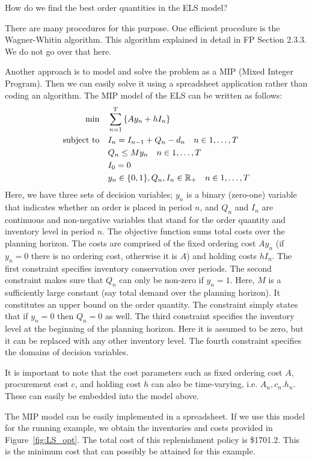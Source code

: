 \begin{exercise}
How do we find the best order quantities in the ELS model?


\begin{solution}
There are many procedures for this purpose. One efficient procedure is the Wagner-Whitin algorithm. This algorithm explained in detail in FP Section 2.3.3. We do not go over that here.

Another approach is to model and solve the problem as a MIP (Mixed Integer Program). Then we can easily solve it using a spreadsheet application rather than coding an algorithm. The MIP model of the ELS can be written as follows:
\begin{align*}
\min\quad 
	& \sum_{n=1}^T \left\{Ay_n + hI_n\right\} \\
\operatorname*{\operatorname{subject}\,\operatorname{to}}\quad
	& I_n = I_{n-1} + Q_n - d_n \quad n\in 1,\ldots,T \\
	& Q_n \leq M y_n \quad n\in 1,\ldots,T \\
	& I_0 = 0 \\
	& y_n \in \{0,1\}, Q_n, I_n \in \mathbb{R}_+ \quad n\in 1,\ldots,T
\end{align*}
Here, we have three sets of decision variables; $y_n$ is a binary (zero-one) variable that indicates whether an order is placed in period $n$, and $Q_n$ and $I_n$ are continuous and non-negative variables that stand for the order quantity and inventory level in period $n$. The objective function sums total costs over the planning horizon. The costs are comprised of the fixed ordering cost $Ay_n$ (if $y_n=0$ there is no ordering cost, otherwise it is $A$) and holding costs $hI_n$. The first constraint specifies inventory conservation over periods. The second constraint makes sure that $Q_n$ can only be non-zero if $y_n=1$. Here, $M$ is a sufficiently large constant (say total demand over the planning horizon). It constitutes an upper bound on the order quantity. The constraint simply states that if $y_n=0$ then $Q_n=0$ as well. The third constraint specifies the inventory level at the beginning of the planning horizon. Here it is assumed to be zero, but it can be replaced with any other inventory level. The fourth constraint specifies the domains of decision variables.

It is important to note that the cost parameters such as fixed ordering cost $A$, procurement cost $c$, and holding cost $h$ can also be time-varying, i.e. $A_n,c_n.h_n$. These can easily be embedded into the model above.

The MIP model can be easily implemented in a spreadsheet. If we use this model for the running example, we obtain the inventories and costs provided in Figure~\ref{fig:LS_opt}. The total cost of this replenishment policy is \$1701.2. This is the minimum cost that can possibly be attained for this example.


\end{solution}
\end{exercise}
